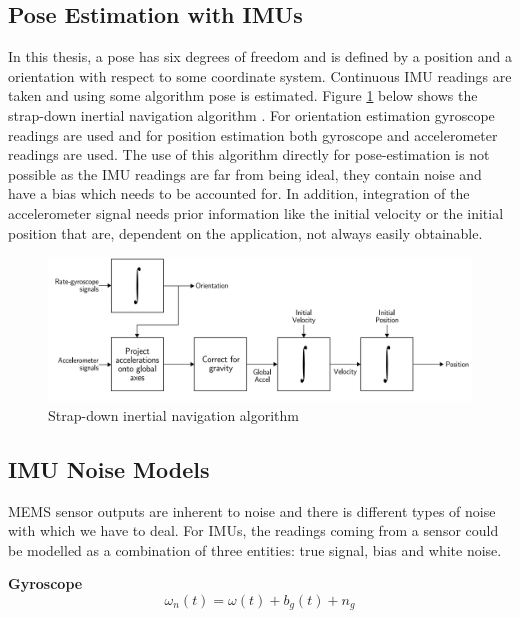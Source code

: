 \subsection{Pose Estimation with IMUs}
In this thesis, a pose has six degrees of freedom and is defined by a position and a orientation with respect to some coordinate system. Continuous IMU readings are taken and using some algorithm pose is estimated. Figure \ref{fig:strapdown_imu} below shows the strap-down inertial navigation algorithm \citep{woodman2007introduction}. For orientation estimation gyroscope readings are used and for position estimation both gyroscope and accelerometer readings are used. The use of this algorithm directly for pose-estimation is not possible as the IMU readings are far from being ideal, they contain noise and have a bias \citep{woodman2007introduction} which needs to be accounted for. In addition, integration of the accelerometer signal needs prior information like the initial velocity or the initial position that are, dependent on the application, not always easily obtainable.

\begin{figure}[H]
\includegraphics[scale=0.2]{images/fig_chapter2/strap_imu_algo.png}
\caption{Strap-down inertial navigation algorithm \citep{woodman2007introduction}}
\label{fig:strapdown_imu}
\end{figure}

\subsection{IMU Noise Models}
MEMS sensor outputs are inherent to noise and there is different types of noise with which we have to deal. For IMUs, the readings coming from a sensor could be modelled as a combination of three entities: true signal, bias and white noise.

\textbf{Gyroscope}
\begin{equation}
    \omega_{n}(t) = \omega(t) + b_{g}(t) + n_{g}
\label{eqn:gyro_noise}
\end{equation}

